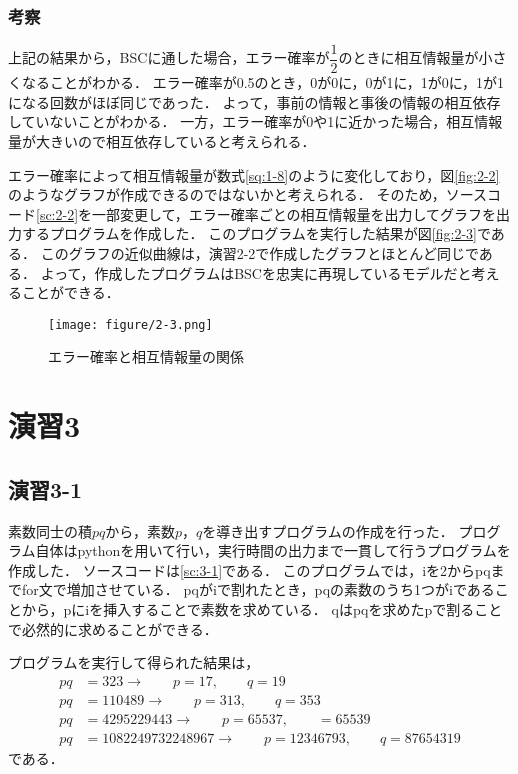 \documentclass[documentclass]{jsarticle}
\begin{document}
\subsubsection*{考察}
上記の結果から，BSCに通した場合，エラー確率が$\dfrac{1}{2}$のときに相互情報量が小さくなることがわかる．
エラー確率が0.5のとき，0が0に，0が1に，1が0に，1が1になる回数がほぼ同じであった．
よって，事前の情報と事後の情報の相互依存していないことがわかる．
一方，エラー確率が0や1に近かった場合，相互情報量が大きいので相互依存していると考えられる．

エラー確率によって相互情報量が数式\ref*{sq:1-8}のように変化しており，図\ref*{fig:2-2}のようなグラフが作成できるのではないかと考えられる．
そのため，ソースコード\ref*{sc:2-2}を一部変更して，エラー確率ごとの相互情報量を出力してグラフを出力するプログラムを作成した．
このプログラムを実行した結果が図\ref*{fig:2-3}である．
このグラフの近似曲線は，演習2-2で作成したグラフとほとんど同じである．
よって，作成したプログラムはBSCを忠実に再現しているモデルだと考えることができる．

\begin{figure}[H]
  \begin{center}
    \texttt{[image: figure/2-3.png]}
  \end{center}
  \caption{エラー確率と相互情報量の関係}
  \label{fig:2-4}
\end{figure}
\newpage

\section*{演習3}
\subsection*{演習3-1}
素数同士の積$pq$から，素数$p$，$q$を導き出すプログラムの作成を行った．
プログラム自体はpythonを用いて行い，実行時間の出力まで一貫して行うプログラムを作成した．
ソースコードは\ref*{sc:3-1}である．
このプログラムでは，iを2からpqまでfor文で増加させている．
pqがiで割れたとき，pqの素数のうち1つがiであることから，pにiを挿入することで素数を求めている．
qはpqを求めたpで割ることで必然的に求めることができる．

プログラムを実行して得られた結果は，
\begin{align*}
  pq &= 323  → \qquad p = 17, \qquad q = 19\\
  pq &= 110489 → \qquad p = 313, \qquad q = 353\\
  pq &= 4295229443 → \qquad p = 65537, \qquad = 65539\\
  pq &= 1082249732248967 → \qquad p =  12346793, \qquad q = 87654319
\end{align*}
である．
\end{document}
